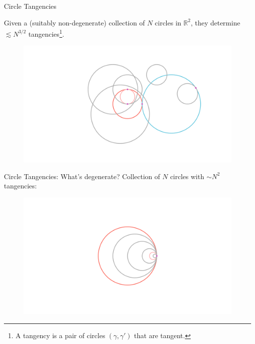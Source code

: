 \documentclass{beamer}
\newcommand{\RR}{\mathbb R}
\newcommand{\nfr}[1]{\begin{frame} #1
\end{frame}}
\begin{document}
\nfr{{Circle Tangencies}
\begin{theorem}
    Given a (suitably non-degenerate) collection of $N$ circles in $\RR^2$, they determine $\lesssim N^{3/2}$ tangencies\footnote{A tangency is a pair of circles $(\gamma,\gamma')$ that are tangent.}. 
\end{theorem}
    \begin{figure}[h]
        \centering
        \includegraphics[trim={5cm 0 4cm 2cm}, clip,width=0.8
        \textwidth]{images/Diagram1.png}

    \end{figure}
}

\nfr{{Circle Tangencies: What's degenerate?}
Collection of $N$ circles with $\sim N^2$ tangencies:
\begin{figure}[h]
    \centering
    \includegraphics[width=1
    \textwidth, trim={5cm 2cm 4cm 2cm}, clip=true]{images/Diagram2.png}
\end{figure}
}
\end{document}
